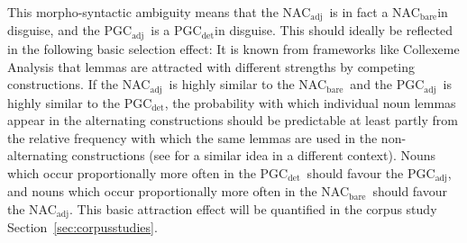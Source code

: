 \documentclass[USenglish]{article}
\newcommand{\Sub}[1]{\ensuremath{\mathrm{_{#1}}}}
\newcommand{\NACb}{NAC\Sub{bare}}
\newcommand{\NACa}{NAC\Sub{adj}}
\newcommand{\PGCd}{PGC\Sub{det}}
\newcommand{\PGCa}{PGC\Sub{adj}}
\begin{document}
This morpho-syntactic ambiguity means that the \NACa\ is in fact a \NACb in disguise, and the \PGCa\ is a \PGCd in disguise.
This should ideally be reflected in the following basic selection effect:
It is known from frameworks like Collexeme Analysis \citep{GriesStefanowitsch2004} that lemmas are attracted with different strengths by competing constructions.
If the \NACa\ is highly similar to the \NACb\ and the \PGCa\ is highly similar to the \PGCd, the probability with which individual noun lemmas appear in the alternating constructions should be predictable at least partly from the relative frequency with which the same lemmas are used in the non-alternating constructions (see \citealp[246--249]{Levshina2016} for a similar idea in a different context).
Nouns which occur proportionally more often in the \PGCd\ should favour the \PGCa, and nouns which occur proportionally more often in the \NACb\ should favour the \NACa.
This basic attraction effect will be quantified in the corpus study Section~\ref{sec:corpusstudies}.

\end{document}
